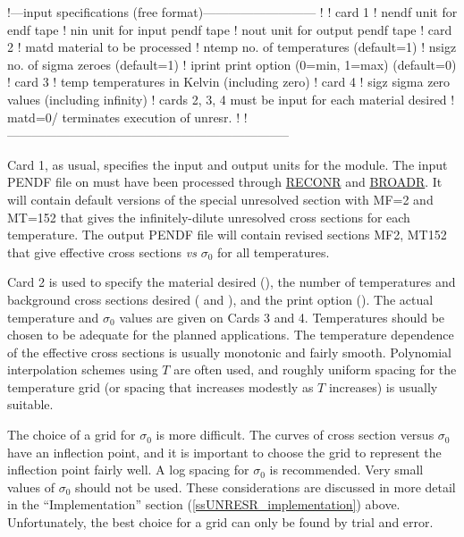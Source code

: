 \small
\begin{ccode}

   !---input specifications (free format)---------------------------
   !
   ! card 1
   !   nendf   unit for endf tape
   !   nin     unit for input pendf tape
   !   nout    unit for output pendf tape
   ! card 2
   !   matd    material to be processed
   !   ntemp   no. of temperatures (default=1)
   !   nsigz   no. of sigma zeroes (default=1)
   !   iprint  print option (0=min, 1=max) (default=0)
   ! card 3
   !   temp    temperatures in Kelvin (including zero)
   ! card 4
   !   sigz    sigma zero values (including infinity)
   !       cards 2, 3, 4 must be input for each material desired
   !       matd=0/ terminates execution of unresr.
   !
   !--------------------------------------------------------------------

\end{ccode}
\normalsize

Card 1, as usual, specifies the input and output units for the
module.  The input PENDF file on  must have been
processed through \hyperlink{sRECONRhy}{RECONR}
and \hyperlink{sBROADRhy}{BROADR}.  It will contain default
versions of the special unresolved section with MF=2 and MT=152 that
gives the infinitely-dilute unresolved cross sections for each
temperature.  The output PENDF file  will contain
revised sections MF2, MT152 that give effective cross sections
{\it vs} $\sigma_0$ for all temperatures.

Card 2 is used to specify the material desired (), the
number of temperatures and background cross sections desired
( and ), and the print option
().  The actual temperature and $\sigma_0$ values
are given on Cards 3 and 4.  Temperatures should be chosen to
be adequate for the planned applications.  The temperature
dependence of the effective cross sections is usually monotonic
and fairly smooth.  Polynomial interpolation schemes using
$T$ are often used, and roughly uniform spacing for
the temperature grid (or spacing that increases modestly as
$T$ increases) is usually suitable.

The choice of a grid for $\sigma_0$ is more difficult.  The
curves of cross section versus $\sigma_0$ have an inflection
point, and it is important to choose the grid to represent the
inflection point fairly well.  A log spacing for $\sigma_0$ is
recommended.  Very small values of $\sigma_0$ should not be used.
These considerations are discussed in more detail in the
``Implementation'' section (\ref{ssUNRESR_implementation}) above.
Unfortunately, the best choice for a grid can only be found by trial and error.


